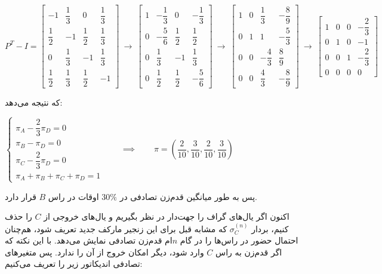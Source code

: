 \documentclass{scribe-cgenomics}
\begin{document}
\begin{حل}
\begin{center}
$
P^T-I
=
\begin{bmatrix}
-1 & \dfrac{1}{3} & 0 & \dfrac{1}{3}\\
\dfrac{1}{2} & -1 & \dfrac{1}{2} & \dfrac{1}{3}\\
0 & \dfrac{1}{3} & -1 & \dfrac{1}{3}\\
\dfrac{1}{2} & \dfrac{1}{3} & \dfrac{1}{2} & -1
\end{bmatrix}
\ \rightarrow \
\begin{bmatrix}
1 & -\dfrac{1}{3} & 0 & -\dfrac{1}{3}\\
0 & -\dfrac{5}{6} & \dfrac{1}{2} & \dfrac{1}{2}\\
0 & \dfrac{1}{3} & -1 & \dfrac{1}{3}\\
0 & \dfrac{1}{2} & \dfrac{1}{2} & -\dfrac{5}{6}
\end{bmatrix}
\ \rightarrow \
\begin{bmatrix}
1 & 0 & \dfrac{1}{3} & -\dfrac{8}{9}\\
0 & 1 & 1 & -\dfrac{5}{3}\\
0 & 0 & -\dfrac{4}{3} & \dfrac{8}{9}\\
0 & 0 & \dfrac{4}{3} & -\dfrac{8}{9}
\end{bmatrix}
\ \rightarrow \
\begin{bmatrix}
1 & 0 & 0 & -\dfrac{2}{3}\\
0 & 1 & 0 & -1\\
0 & 0 & 1 & -\dfrac{2}{3}\\
0 & 0 & 0 & 0
\end{bmatrix}
$
\end{center}

که نتیجه می‌دهد:

\begin{center}
$
\begin{cases}
\pi_A - \dfrac{2}{3}\pi_D = 0\\
\pi_B - \pi_D = 0\\
\pi_C - \dfrac{2}{3}\pi_D = 0\\
\pi_A + \pi_B + \pi_C + \pi_D = 1
\end{cases}
\qquad \implies \qquad
\pi = (\dfrac{2}{10}, \dfrac{3}{10}, \dfrac{2}{10}, \dfrac{3}{10})
$
\end{center}

پس به طور میانگین قدم‌زن تصادفی در
$30\%$
اوقات در راس
$B$
قرار دارد.

\vspace*{1in}

اکنون اگر یال‌های گراف را جهت‌دار در نظر بگیریم و یال‌های خروجی از
$C$
را حذف کنیم، بردار
$\sigma_C^{(n)}$
که مشابه قبل برای این زنجیر مارکف جدید تعریف شود، هم‌چنان احتمال حضور در راس‌ها را در گام
$n$ام
قدم‌زن تصادفی نمایش می‌دهد. با این نکته که اگر قدم‌زن به راس
$C$
وارد شود، دیگر امکان خروج از آن را ندارد. پس متغیرهای تصادفی اندیکاتور زیر را تعریف می‌کنیم:


\end{حل}
\end{document}
